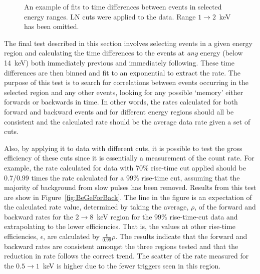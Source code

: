 			\begin{sidewaysfigure}
				\centering
				\def\figwidth{0.45\textheight}
				\def\plotname{LNExponential}
				\subfigure[$0.45\to0.55$~keV]{
					\texttt{[image: \\plotname\_0.45\_0.55]}
					\label{fig:\plotname45to55}
				}			
				\subfigure[$0.5\to1$~keV]{
					\texttt{[image: \\plotname\_0.5\_1]}
					\label{fig:\plotname5to1}
				}
				\subfigure[$3\to8$~keV]{
					\texttt{[image: \\plotname\_3\_8]}
					\label{fig:\plotname3to8}
				}
				\subfigure[$10\to10.76$~keV]{
					\texttt{[image: \\plotname\_10\_10.76]}
					\label{fig:\plotname10to1076}
				}									
				
				\caption[Fits to time differences between events in selected energy ranges]
				{An example of fits to time differences between events in selected energy ranges.  
				LN cuts were applied to the data.  Range $1\to2$~keV has been omitted.}
				\label{fig:BeGeExpFits}
			\end{sidewaysfigure}
			
	The final test described in this section involves selecting events in a given energy region and calculating the time differences to the events at \emph{any} energy (below 14~keV) both immediately previous and immediately following.  These time differences are then binned and fit to an exponential to extract the rate.  The purpose of this test is to search for correlations between events occurring in the selected region and any other events, looking for any possible `memory' either forwards or backwards in time.  In other words, the rates calculated for both forward and backward events and for different energy regions should all be consistent and the calculated rate should be the average data rate given a set of cuts.  
	
	Also, by applying it to data with different cuts, it is possible to test the gross efficiency of these cuts since it is essentially a measurement of the count rate.  For example, the rate calculated for data with 70\% rise-time cut applied should be 0.7/0.99 times the rate calculated for a 99\% rise-time cut, assuming that the majority of background from slow pulses has been removed.  Results from this test are show in Figure~\ref{fig:BeGeForBack}.  The line in the figure is an expectation of the calculated rate value, determined by taking the average, $\rho$, of the forward and backward rates for the $2\to8$~keV region for the 99\% rise-time-cut data and extrapolating to the lower efficiencies.  That is, the values at other rise-time efficiencies,  $\epsilon$, are calculated by $\frac{\epsilon}{0.99}\rho$.  The results indicate that the forward and backward rates are consistent amongst the three regions tested and that the reduction in rate follows the correct trend.  The scatter of the rate measured for the $0.5\to1$~keV is higher due to the fewer triggers seen in this region.
	
